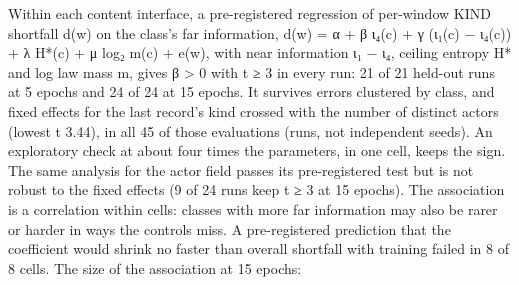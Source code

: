 \documentclass[10pt]{article}
\begin{document}
Within each content interface, a pre-registered regression of per-window KIND shortfall d(w) on the class's far
information, d(w) = α + β ι₄(c) + γ (ι₁(c) − ι₄(c)) + λ H*(c) + μ log₂ m(c) + e(w), with near information ι₁ − ι₄,
ceiling entropy H* and log law mass m, gives β \textgreater{} 0 with t ≥ 3 in every run:
21 of 21 held-out runs at 5 epochs and 24 of 24 at 15 epochs. It survives errors clustered by class, and fixed effects
for the last record's kind crossed with the number of distinct actors (lowest t 3.44), in all 45 of those evaluations
(runs, not independent seeds). An exploratory check at about four times the parameters, in one cell, keeps the sign. The
same analysis for the actor field passes its pre-registered test but is not robust to the fixed effects (9 of 24 runs
keep t ≥ 3 at 15 epochs). The association is a correlation within cells: classes with more far information may also be
rarer or harder in ways the controls miss. A pre-registered prediction that the coefficient would shrink no faster than
overall shortfall with training failed in 8 of 8 cells. The size of the association at 15 epochs:
\end{document}
